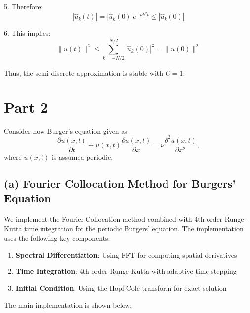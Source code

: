 \documentclass{article}
\begin{document}
5. Therefore:
\begin{equation}
    |\hat{u}_k(t)| = |\hat{u}_k(0)|e^{-\nu k^2t} \leq |\hat{u}_k(0)|
\end{equation}

6. This implies:
\begin{equation}
    \|u(t)\|^2 \leq \sum_{k=-N/2}^{N/2} |\hat{u}_k(0)|^2 = \|u(0)\|^2
\end{equation}

Thus, the semi-discrete approximation is stable with $C = 1$.

\section*{Part 2}
Consider now Burger's equation given as
\begin{equation}
    \frac{\partial u(x, t)}{\partial t} + u(x, t) \frac{\partial u(x, t)}{\partial x} = \nu \frac{\partial^2 u(x, t)}{\partial x^2},
\end{equation}
where $u(x, t)$ is assumed periodic. 

\subsection*{(a) Fourier Collocation Method for Burgers' Equation}
We implement the Fourier Collocation method combined with 4th order Runge-Kutta time integration for the periodic Burgers' equation. The implementation uses the following key components:

\begin{enumerate}
    \item \textbf{Spectral Differentiation}: Using FFT for computing spatial derivatives
    \item \textbf{Time Integration}: 4th order Runge-Kutta with adaptive time stepping
    \item \textbf{Initial Condition}: Using the Hopf-Cole transform for exact solution
\end{enumerate}

The main implementation is shown below:
\end{document}
